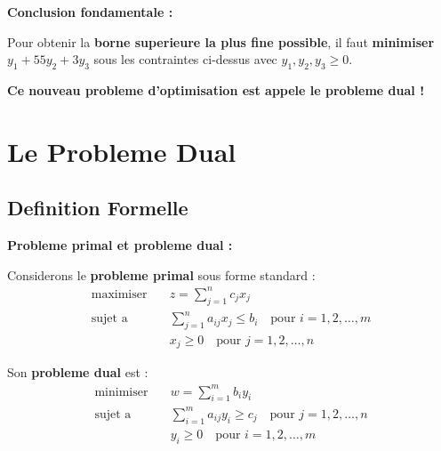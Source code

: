 \documentclass[12pt,a4paper]{article}
\begin{document}
\begin{important}
\textbf{Conclusion fondamentale :}

Pour obtenir la \textcolor{importantrouge}{\textbf{borne superieure la plus fine possible}}, il faut \textcolor{defvert}{\textbf{minimiser}} $y_1 + 55y_2 + 3y_3$ sous les contraintes ci-dessus avec $y_1, y_2, y_3 \geq 0$.

\textcolor{titrebleu}{\textbf{Ce nouveau probleme d'optimisation est appele le probleme dual !}}
\end{important}

\section{Le Probleme Dual}

\subsection{Definition Formelle}

\begin{definition}
\textbf{Probleme primal et probleme dual :}

Considerons le \textcolor{titrebleu}{\textbf{probleme primal}} sous forme standard :
\begin{align*}
\text{maximiser} \quad & z = \sum_{j=1}^{n} c_j x_j\\
\text{sujet a} \quad & \sum_{j=1}^{n} a_{ij} x_j \leq b_i \quad \text{pour } i = 1, 2, \ldots, m\\
& x_j \geq 0 \quad \text{pour } j = 1, 2, \ldots, n
\end{align*}

Son \textcolor{defvert}{\textbf{probleme dual}} est :
\begin{align*}
\text{minimiser} \quad & w = \sum_{i=1}^{m} b_i y_i\\
\text{sujet a} \quad & \sum_{i=1}^{m} a_{ij} y_i \geq c_j \quad \text{pour } j = 1, 2, \ldots, n\\
& y_i \geq 0 \quad \text{pour } i = 1, 2, \ldots, m
\end{align*}
\end{definition}
\end{document}
